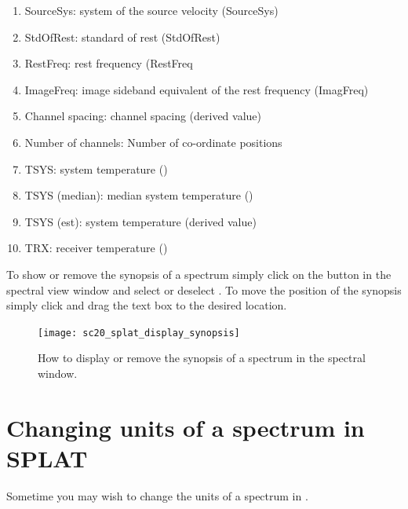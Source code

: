 \documentclass[11pt,oneside,chapters]{starlink}
\providecommand{\att}[1]{\textsf{#1}}
\begin{document}
\begin{enumerate}
\item  SourceSys: system of the source velocity (\att{SourceSys})
\item  StdOfRest: standard of rest (\att{StdOfRest})
\item  RestFreq: rest frequency (\att{RestFreq}
\item  ImageFreq: image sideband equivalent of the rest frequency (\att{ImagFreq})
\item  Channel spacing: channel spacing (derived value)
\item  Number of channels: Number of co-ordinate positions
\item  TSYS: system temperature ()
\item  TSYS (median): median system temperature ()
\item  TSYS (est): system temperature (derived value)
\item  TRX: receiver temperature ()
\end{enumerate}

To show or remove the synopsis of a spectrum simply click on the
 button in the spectral view window and select or deselect
. To move the position of the synopsis simply click
and drag the text box to the desired location.

\begin{figure}[h!]
\begin{center}
\texttt{[image: sc20\_splat\_display\_synopsis]}
\caption[Display or remove the spectral synopsis.]{\label{fig:splat_synopsis}
  How to display or remove the synopsis of a spectrum in the spectral
  window.}
\end{center}
\end{figure}

\section{Changing units of a spectrum in SPLAT}
\label{sec:splat-units}

Sometime you may wish to change the units of a spectrum in \splat.
\end{document}
